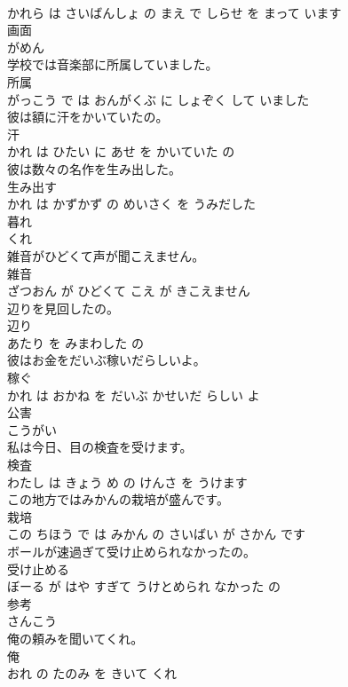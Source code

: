 \documentclass[8pt]{extreport}
\begin{document}
\begin{CJK}{UTF8}{min}
\\	かれら は さいばんしょ の まえ で しらせ を まって います			
\\	画面	
\\	がめん			
\\	学校では音楽部に所属していました。	
\\	所属 
\\	がっこう で は おんがくぶ に しょぞく して いました			
\\	彼は額に汗をかいていたの。	
\\	汗 
\\	かれ は ひたい に あせ を かいていた の			
\\	彼は数々の名作を生み出した。	
\\	生み出す 
\\	かれ は かずかず の めいさく を うみだした			
\\	暮れ	
\\	くれ			
\\	雑音がひどくて声が聞こえません。	
\\	雑音 
\\	ざつおん が ひどくて こえ が きこえません			
\\	辺りを見回したの。	
\\	辺り 
\\	あたり を みまわした の			
\\	彼はお金をだいぶ稼いだらしいよ。	
\\	稼ぐ 
\\	かれ は おかね を だいぶ かせいだ らしい よ			
\\	公害	
\\	こうがい			
\\	私は今日、目の検査を受けます。	
\\	検査 
\\	わたし は きょう め の けんさ を うけます			
\\	この地方ではみかんの栽培が盛んです。	
\\	栽培 
\\	この ちほう で は みかん の さいばい が さかん です			
\\	ボールが速過ぎて受け止められなかったの。	
\\	受け止める 
\\	ぼーる が はや すぎて うけとめられ なかった の			
\\	参考	
\\	さんこう			
\\	俺の頼みを聞いてくれ。	
\\	俺 
\\	おれ の たのみ を きいて くれ			

\end{CJK}
\end{document}
